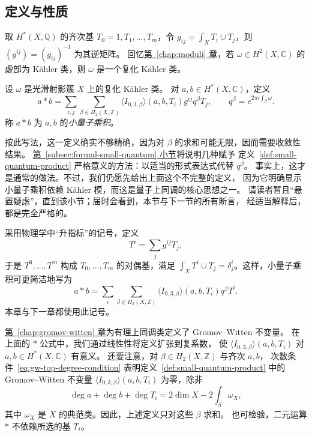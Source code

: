 \subsection{定义与性质}\label{subsec:small-quantum-definition}
取 $H^*(X,\mathbb Q)$ 的齐次基 $T_0=1,T_1,\ldots,T_m$，令
$g_{ij}=\int_XT_i\cup T_j$，则 $(g^{ij})=(g_{ij})^{-1}$ 为其逆矩阵。
回忆\hyperref[chap:moduli]{第~\ref*{chap:moduli} 章}，若 $\omega\in H^2(X,\mathbb C)$ 的虚部为 Kähler 类，则 $\omega$ 是一个复化 Kähler 类。
\begin{definition}\label{def:small-quantum-product}
设 $\omega$ 是光滑射影簇 $X$ 上的复化 Kähler 类。
对 $a,b\in H^*(X,\mathbb C)$，定义
\[
a*b=\sum_{i,j}\sum_{\beta\in H_2(X,\mathbb Z)}
\langle I_{0,3,\beta}\rangle(a,b,T_i)g^{ij}q^\beta T_j,
\qquad q^\beta=e^{2\pi i\int_\beta\omega}.
\]
称 $a*b$ 为 $a,b$ 的\emph{小量子乘积}。
\end{definition}
按此写法，这一定义确实不够精确，因为对 $\beta$ 的求和可能无限，因而需要收敛性结果。
\hyperref[subsec:formal-small-quantum]{第~\ref*{subsec:formal-small-quantum} 小节}将说明几种赋予
定义~\ref{def:small-quantum-product} 严格意义的方法：以适当的形式表达式代替 $q^\beta$。
事实上，这才是通常的做法。不过，我们仍愿先给出上面这个不完整的定义，
因为它明确显示小量子乘积依赖 Kähler 模，而这是量子上同调的核心思想之一。
请读者暂且“悬置疑虑”，直到该小节；届时会看到，本节与下一节的所有断言，
经适当解释后，都是完全严格的。

采用物理学中“升指标”的记号，定义
\[
T^i=\sum_jg^{ij}T_j,
\]
于是 $T^0,\ldots,T^m$ 构成 $T_0,\ldots,T_m$ 的对偶基，满足
$\int_XT^i\cup T_j=\delta^i_j$。这样，小量子乘积可更简洁地写为
\begin{equation}\label{eq:small-quantum-product}
a*b=\sum_i\sum_{\beta\in H_2(X,\mathbb Z)}\langle I_{0,3,\beta}\rangle(a,b,T_i)q^\beta T^i.
\end{equation}
本章与下一章都使用此记号。

\hyperref[chap:gromov-witten]{第~\ref*{chap:gromov-witten} 章}为有理上同调类定义了 Gromov--Witten 不变量。
在上面的 $*$ 公式中，我们通过线性性将定义扩张到复系数，
使 $\langle I_{0,3,\beta}\rangle(a,b,T_i)$ 对 $a,b\in H^*(X,\mathbb C)$ 有意义。
还要注意，对 $\beta\in H_2(X,\mathbb Z)$ 与齐次 $a,b$，
次数条件~\eqref{eq:gw-top-degree-condition} 表明定义~\ref{def:small-quantum-product} 中的
Gromov--Witten 不变量 $\langle I_{0,3,\beta}\rangle(a,b,T_i)$ 为零，除非
\begin{equation}\label{eq:quantum-three-point-degree}
\deg a+\deg b+\deg T_i=2\dim X-2\int_\beta\omega_X,
\end{equation}
其中 $\omega_X$ 是 $X$ 的典范类。因此，上述定义只对这些 $\beta$ 求和。
也可检验，二元运算 $*$ 不依赖所选的基 $T_i$。

